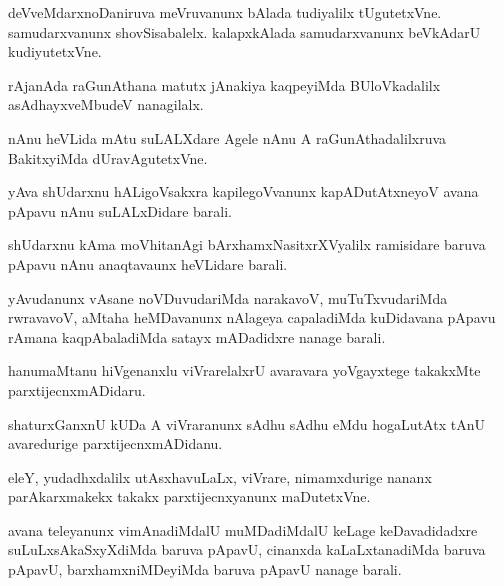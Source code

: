 \documentclass{article}
\begin{document}
\begin{mn}%
deVveMdarxnoDaniruva meVruvanunx bAlada tudiyalilx tUgutetxVne. samudarxvanunx 
shovSisabalelx. kalapxkAlada samudarxvanunx beVkAdarU kudiyutetxVne.
\end{mn}

\begin{mn}%
rAjanAda raGunAthana matutx jAnakiya kaqpeyiMda BUloVkadalilx asAdhayxveMbudeV nanagilalx.
\end{mn}

\begin{mn}%
nAnu heVLida mAtu suLALXdare Agele nAnu A raGunAthadalilxruva BakitxyiMda dUravAgutetxVne.
\end{mn}

\begin{mn}%
yAva shUdarxnu hALigoVsakxra kapilegoVvanunx kapADutAtxneyoV avana pApavu nAnu 
suLALxDidare barali.
\end{mn}

\begin{mn}%
shUdarxnu kAma moVhitanAgi bArxhamxNasitxrXVyalilx ramisidare baruva pApavu nAnu 
anaqtavaunx heVLidare barali.
\end{mn}

\begin{mn}%
yAvudanunx vAsane noVDuvudariMda narakavoV, muTuTxvudariMda rwravavoV, aMtaha heMDavanunx 
nAlageya capaladiMda kuDidavana pApavu rAmana kaqpAbaladiMda satayx mADadidxre nanage barali.
\end{mn}

\begin{mn}%
hanumaMtanu hiVgenanxlu viVrarelalxrU avaravara yoVgayxtege takakxMte parxtijecnxmADidaru.
\end{mn}

\begin{mn}%
shaturxGanxnU kUDa A viVraranunx sAdhu sAdhu eMdu hogaLutAtx tAnU avaredurige 
parxtijecnxmADidanu.
\end{mn}

\begin{mn}%
eleY, yudadhxdalilx utAsxhavuLaLx, viVrare, nimamxdurige nananx parAkarxmakekx takakx 
parxtijecnxyanunx maDutetxVne.
\end{mn}

\begin{mn}%
avana teleyanunx vimAnadiMdalU muMDadiMdalU keLage keDavadidadxre suLuLxsAkaSxyXdiMda baruva 
pApavU, cinanxda kaLaLxtanadiMda baruva pApavU, barxhamxniMDeyiMda baruva pApavU nanage 
barali.
\end{mn}
\end{document}
